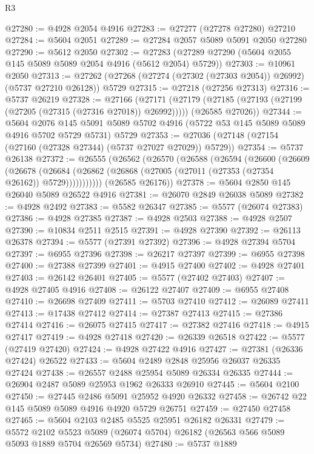 \begin{lexlean}{R3}
\begin{coremodule}
@27280 := @4928 @2054 @4916
@27283 := @27277 (@27278 @27280) @27210
@27284 := @5604 @2051
@27289 := @27284 @2057 @5089 @5091 @2050 @27280
@27290 := @5612 @2050
@27302 := @27283 (@27289 @27290 (@5604 @2055 @145 @5089 @5089 @2054 @4916 (@5612 @2054) @5729))
@27303 := @10961 @2050
@27313 := @27262 (@27268 (@27274 (@27302 (@27303 @2054)) @26992) (@5737 @27210 @26128)) @5729
@27315 := @27218 (@27256 @27313)
@27316 := @5737 @26219
@27328 := @27166
    (@27171
      (@27179 (@27185 (@27193 (@27199 (@27205 (@27315 (@27316 @27018)) @26992)))))
      (@26585 @27026))
@27344 := @5604
    @2076
    @145
    @5091
    @5089
    @5702
    @4916
    (@5722 @53 @145 @5089 @5089 @4916 @5702 @5729 @5731)
    @5729
@27353 := @27036 (@27148 (@27154 (@27160 (@27328 @27344) (@5737 @27027 @27029)) @5729))
@27354 := @5737 @26138
@27372 := @26555
    (@26562
      (@26570
        (@26588
          (@26594
            (@26600
              (@26609
                (@26678
                  (@26684 (@26862 (@26868 (@27005 (@27011 (@27353 (@27354 @26162)) @5729)))))))))))
      (@26585 @26176))
@27378 := @5604 @2850 @145 @26040 @5089 @26522 @4916
@27381 := @26070 @2849 @26038 @5089
@27382 := @4928 @2492
@27383 := @5582 @26347
@27385 := @5577 (@26074 @27383)
@27386 := @4928 @27385
@27387 := @4928 @2503
@27388 := @4928 @2507
@27390 := @10834 @2511 @2515
@27391 := @4928 @27390
@27392 := @26113 @26378
@27394 := @5577 (@27391 @27392)
@27396 := @4928 @27394 @5704
@27397 := @6955 @27396
@27398 := @26217 @27397
@27399 := @6955 @27398
@27400 := @27388 @27399
@27401 := @4915 @27400
@27402 := @4928 @27401
@27403 := @26142 @26401
@27405 := @5577 (@27402 @27403)
@27407 := @4928 @27405 @4916
@27408 := @26122 @27407
@27409 := @6955 @27408
@27410 := @26698 @27409
@27411 := @5703 @27410
@27412 := @26089 @27411
@27413 := @17438 @27412
@27414 := @27387 @27413
@27415 := @27386 @27414
@27416 := @26075 @27415
@27417 := @27382 @27416
@27418 := @4915 @27417
@27419 := @4928 @27418
@27420 := @26339 @26518
@27422 := @5577 (@27419 @27420)
@27424 := @4928 @27422 @4916
@27427 := @27381 (@26336 @27424) @26522
@27433 := @5604 @2489 @2848 @25956 @26037 @26335 @27424
@27438 := @26557 @2488 @25954 @5089 @26334 @26335
@27444 := @26904 @2487 @5089 @25953 @1962 @26333 @26910
@27445 := @5604 @2100
@27450 := @27445 @2486 @5091 @25952 @4920 @26332
@27458 := @26742 @22 @145 @5089 @5089 @4916 @4920 @5729 @26751
@27459 := @27450 @27458
@27465 := @5604 @2103 @2485 @5525 @25951 @26182 @26331
@27479 := @5572
    @2102
    @5523
    @5089
    (@26074 @5704)
    @26182
    (@26563 @566 @5089 @5093 @1889 @5704 @26569 @5734)
@27480 := @5737 @1889

\end{coremodule}
\end{lexlean}
